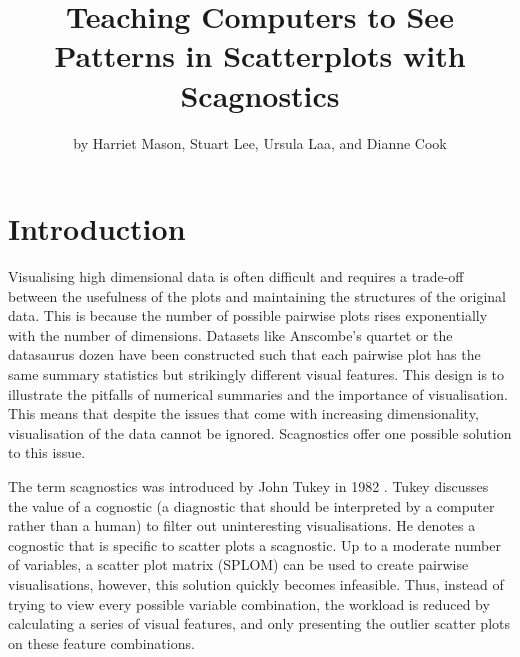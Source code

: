 \title{Teaching Computers to See Patterns in Scatterplots with
Scagnostics}
\author{by Harriet Mason, Stuart Lee, Ursula Laa, and Dianne Cook}

\maketitle


\hypertarget{introduction}{%
\section{Introduction}\label{introduction}}

Visualising high dimensional data is often difficult and requires a
trade-off between the usefulness of the plots and maintaining the
structures of the original data. This is because the number of possible
pairwise plots rises exponentially with the number of dimensions.
Datasets like Anscombe's quartet \citep{anscombe} or the datasaurus
dozen \citep{datasaurpkg} have been constructed such that each pairwise
plot has the same summary statistics but strikingly different visual
features. This design is to illustrate the pitfalls of numerical
summaries and the importance of visualisation. This means that despite
the issues that come with increasing dimensionality, visualisation of
the data cannot be ignored. Scagnostics offer one possible solution to
this issue.

The term scagnostics was introduced by John Tukey in 1982 \citep{tukey}.
Tukey discusses the value of a cognostic (a diagnostic that should be
interpreted by a computer rather than a human) to filter out
uninteresting visualisations. He denotes a cognostic that is specific to
scatter plots a scagnostic. Up to a moderate number of variables, a
scatter plot matrix (SPLOM) can be used to create pairwise
visualisations, however, this solution quickly becomes infeasible. Thus,
instead of trying to view every possible variable combination, the
workload is reduced by calculating a series of visual features, and only
presenting the outlier scatter plots on these feature combinations.

